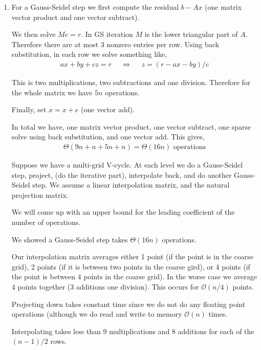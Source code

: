 \documentclass[10pt]{article}
\begin{document}
\begin{solution}[Solution]
\begin{enumerate}[label=(\alph*)]
    \item
        For a Gauss-Seidel step we first compute the residual \( b-Ax \) (one matrix vector product and one vector subtract).

        We then solve \( Me = r \). In GS iteration \( M \) is the lower triangular part of \( A \). Therefore there are at most 3 nonzero entries per row. Using back substitution, in each row we solve something like,
        \begin{align*}
            ax + by + cz = r && \Longleftrightarrow &&
            z = (r-ax-by)/c
        \end{align*}
        
        This is two multiplications, two subtractions and one division. Therefore for the whole matrix we have \( 5n \) operations.

        Finally, set \( x = x + e \) (one vector add).

        In total we have, one matrix vector product, one vector subtract, one sparse solve using back substitution, and one vector add. This gives,
        \begin{align*}
            \Theta(9n + n + 5n + n) = \Theta(16n) \text{ operations}
        \end{align*}
        
        \vspace{1em}


        Suppose we have a multi-grid V-cycle. At each level we do a Gauss-Seidel step, project, (do the iterative part), interpolate back, and do another Gauss-Seidel step.
        We assume a linear interpolation matrix, and the natural projection matrix.

        We will come up with an upper bound for the leading coefficient of the number of operations.

        We showed a Gauss-Seidel step takes \( \Theta(16n) \) operations.

        Our interpolation matrix averages either 1 point (if the point is in the coarse grid), 2 points (if it is between two points in the coarse gird), or 4 points (if the point is between 4 points in the coarse grid). In the worse case we average 4 points together (3 additions one division). This occurs for \( \mathcal{O} (n/4) \) points.

        Projecting down takes constant time since we do not do any floating point operations (although we do read and write to memory \( \mathcal{O} (n) \) times.

        Interpolating takes less than 9 multiplications and 8 additions for each of the \( (n-1)/2 \) rows.


\end{enumerate}
\end{solution}
\end{document}
